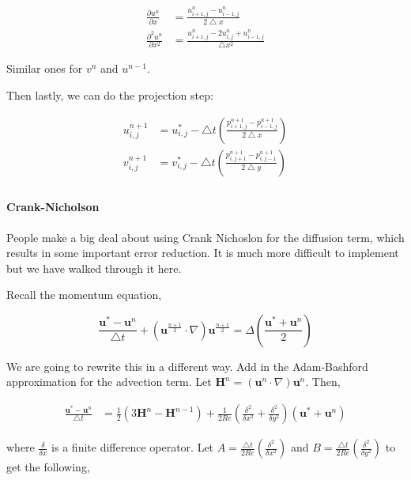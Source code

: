 \documentclass[12pt]{article}
\begin{document}
\begin{align*}
    \frac{\partial u^n}{\partial x} &= \frac{u^n_{i+1,j} - u^n_{i-1,j}}{2\bigtriangleup x} \\
    \frac{\partial^2 u^n}{\partial x^2} &= \frac{u^n_{i+1,j} - 2u^n_{i,j} + u^n_{i-1,j}}{\bigtriangleup x^2}
\end{align*}

Similar ones for $v^n$ and $u^{n-1}$.

Then lastly, we can do the projection step:

\begin{align*}
    u^{n+1}_{i,j} &= u^*_{i,j} - \bigtriangleup t (\frac{p^{n+1}_{i+1,j} - p^{n+1}_{i-1,j}}{2\bigtriangleup x}) \\
    v^{n+1}_{i,j} &= v^*_{i,j} - \bigtriangleup t (\frac{p^{n+1}_{i,j+1} - p^{n+1}_{i,j-1}}{2\bigtriangleup y}) \\
\end{align*}

\paragraph{Crank-Nicholson}
People make a big deal about using Crank Nichoslon for the diffusion term, which results in some important error reduction. It is much more difficult to implement but we have walked through it here.

Recall the momentum equation,

\begin{equation}
    \frac{\mathbf{u}^* - \mathbf{u}^n}{\bigtriangleup t} + (\mathbf{u}^{\frac{n+1}{2}} \cdot \nabla) \mathbf{u}^{\frac{n+1}{2}} = \Delta (\frac{\mathbf{u}^* + \mathbf{u}^n}{2})
\end{equation}

We are going to rewrite this in a different way. Add in the Adam-Bashford approximation for the advection term. Let $\mathbf{H}^n = (\mathbf{u}^{n} \cdot \nabla) \mathbf{u}^{n}$. Then,

\begin{align*}
    \frac{\mathbf{u}^* - \mathbf{u}^n}{\bigtriangleup t} &= \frac{1}{2}(3\mathbf{H}^n - \mathbf{H}^{n-1}) + \frac{1}{2Re}(\frac{\delta^2}{\delta x^2} + \frac{\delta^2}{\delta y^2})(\mathbf{u}^* + \mathbf{u}^n)
\end{align*}

where $\frac{\delta}{\delta x}$ is a finite difference operator. Let $A = \frac{\bigtriangleup t}{2 Re}(\frac{\delta^2}{\delta x^2})$ and $B = \frac{\bigtriangleup t}{2 Re}(\frac{\delta^2}{\delta y^2})$ to get the following,
\end{document}
